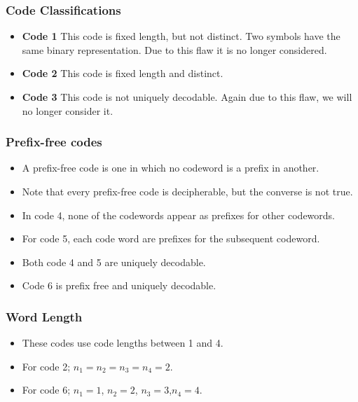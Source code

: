 \documentclass[a4]{beamer}
\begin{document}
\begin{frame}
\frametitle{Code Classifications}
\begin{itemize}
\item \textbf{Code 1} This code is fixed length, but not distinct. Two symbols have the same binary representation. Due to this flaw it is no longer considered.
\item \textbf{Code 2} This code is fixed length and distinct. 
\item \textbf{Code 3} This code is not uniquely decodable. Again due to this flaw, we will no longer consider it.

\end{itemize}
\end{frame}
\begin{frame}
\frametitle{Prefix-free codes}
\begin{itemize}
\item A prefix-free code is one in which no codeword is a prefix in another. \item Note that every prefix-free code is decipherable, but the converse is not true. 
    \item In code 4, none of the codewords appear as prefixes for other codewords.
\item For code 5, each code word are prefixes for the subsequent codeword.
\item Both code 4 and 5 are uniquely decodable.
\item Code 6 is prefix free and uniquely decodable.
\end{itemize}
\end{frame}
\begin{frame}
\frametitle{Word Length}
\begin{itemize}
\item These codes use code lengths between 1 and 4.
\item For code 2; $n_1 = n_2 = n_3 = n_4 = 2$.
\item For code 6; $n_1 = 1$, $n_2 = 2$, $n_3 = 3$,$n_4 = 4$.
\end{itemize}
\end{frame}
\end{document}
